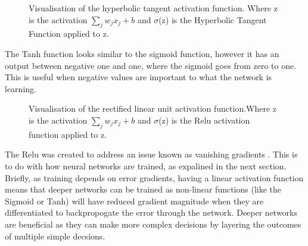 \begin{figure}
\begin{center}
\caption{Visualisation of the hyperbolic tangent activation function. Where z is the activation $\sum_{j} w_j x_j + b$ and $\sigma$(z) is the Hyperbolic Tangent Function applied to z.}
\label{fig:activation_tanh}
\end{center}
\end{figure}

The \ac{Tanh} function looks similar to the sigmoid function, however it has an output between negative one and one, where the sigmoid goes from zero to one. This is useful when negative values are important to what the network is learning.


\begin{figure}
\begin{center}
\caption{Visualisation of the rectified linear unit activation function.Where z is the activation $\sum_{j} w_j x_j + b$ and $\sigma$(z) is the \ac{Relu} activation function applied to z.}
\label{fig:activation_relu}
\end{center}
\end{figure}

The \ac{Relu} was created to address an issue known as vanishing gradients \cite{hochreiter1998vanishing}. This is to do with how neural networks are trained, as expalined in the next section. Briefly, as training depends on error gradients, having a linear activation function means that deeper networks can be trained as non-linear functions (like the Sigmoid or \ac{Tanh}) will have reduced gradient magnitude when they are differentiated to backpropogate the error through the network. Deeper networks are beneficial as they can make more complex decisions by layering the outcomes of multiple simple decsions.

